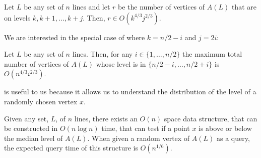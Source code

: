\documentclass{cccg12}
\begin{document}
\begin{lem}
 Let $L$ be any set of $n$ lines and let $r$ be the number of vertices
 of $A(L)$ that are on levels $k,k+1,\ldots,k+j$.  Then, $r \in
 O(k^{4/3}j^{2/3})$.
\end{lem}

We are interested in the special case of  where $k=n/2-i$
and $j=2i$:

\begin{cor}
  Let $L$ be any set of $n$ lines.  Then, for any $i\in\{1,\ldots,n/2\}$
  the maximum total number of vertices of $A(L)$ whose level is in
  $\{n/2-i,\ldots,n/2+i\}$ is $O(n^{4/3}i^{2/3})$.
\end{cor}

 is useful to us because it allows us to understand the
distribution of the level of a randomly chosen vertex $x$.

\begin{thm}
  Given any set, $L$, of $n$ lines, there exists an $O(n)$ space data
  structure, that can be constructed in $O(n\log n)$ time, that can test
  if a point $x$ is above or below the median level of $A(L)$.  When given
  a random vertex of $A(L)$ as a query, the expected query time of this
  structure is $O(n^{1/6})$.
\end{thm}
\end{document}

